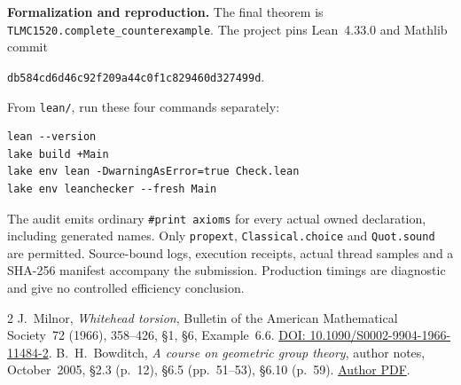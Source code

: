 \documentclass[10pt]{article}
\begin{document}
\textbf{Formalization and reproduction.}
The final theorem is \texttt{TLMC1520.complete\_counterexample}.
The project pins Lean~4.33.0 and Mathlib commit
\begin{center}
{\footnotesize\texttt{db584cd6d46c92f209a44c0f1c829460d327499d}}.
\end{center}
From \texttt{lean/}, run these four commands separately:
\begin{verbatim}
lean --version
lake build +Main
lake env lean -DwarningAsError=true Check.lean
lake env leanchecker --fresh Main
\end{verbatim}
The audit emits ordinary \texttt{\#print axioms} for every actual owned
declaration, including generated names. Only \texttt{propext},
\texttt{Classical.choice} and \texttt{Quot.sound} are permitted.
Source-bound logs, execution receipts, actual thread samples and a
SHA-256 manifest accompany the submission. Production timings are
diagnostic and give no controlled efficiency conclusion.

\begin{thebibliography}{2}\small
{} J.~Milnor, \emph{Whitehead torsion},
Bulletin of the American Mathematical Society~72 (1966), 358--426,
\S1, \S6, Example~6.6.
\href{https://doi.org/10.1090/S0002-9904-1966-11484-2}{DOI: 10.1090/S0002-9904-1966-11484-2}.
 B.~H.~Bowditch, \emph{A course on geometric group theory},
author notes, October~2005, \S2.3 (p.~12), \S6.5 (pp.~51--53),
\S6.10 (p.~59).
\href{https://www.bhbowditch.com/papers/bhb-ggtcourse.pdf}{Author PDF}.
\end{thebibliography}
\end{document}
